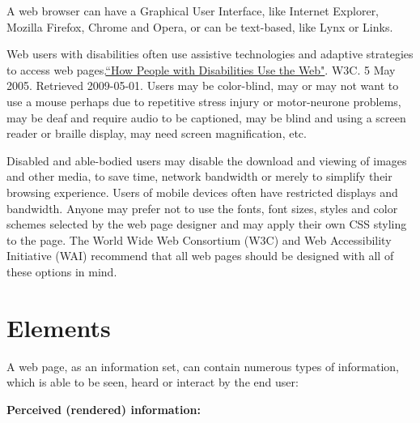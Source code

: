 A web browser can have a Graphical User Interface, like Internet Explorer, Mozilla Firefox, Chrome and Opera, or can be text-based, like Lynx or Links.

Web users with disabilities often use assistive technologies and adaptive strategies to access web pages.\href{http://www.w3.org/WAI/EO/Drafts/PWD-Use-Web/}{``How People with Disabilities Use the Web"}. W3C. 5 May 2005. Retrieved 2009-05-01. Users may be color-blind, may or may not want to use a mouse perhaps due to repetitive stress injury or motor-neurone problems, may be deaf and require audio to be captioned, may be blind and using a screen reader or braille display, may need screen magnification, etc.


Disabled and able-bodied users may disable the download and viewing of images and other media, to save time, network bandwidth or merely to simplify their browsing experience. Users of mobile devices often have restricted displays and bandwidth. Anyone may prefer not to use the fonts, font sizes, styles and color schemes selected by the web page designer and may apply their own CSS styling to the page. The World Wide Web Consortium (W3C) and Web Accessibility Initiative (WAI) recommend that all web pages should be designed with all of these options in mind.




\section{Elements}


A web page, as an information set, can contain numerous types of information, which is able to be seen, heard or interact by the end user:


\textbf{Perceived (rendered) information:}


